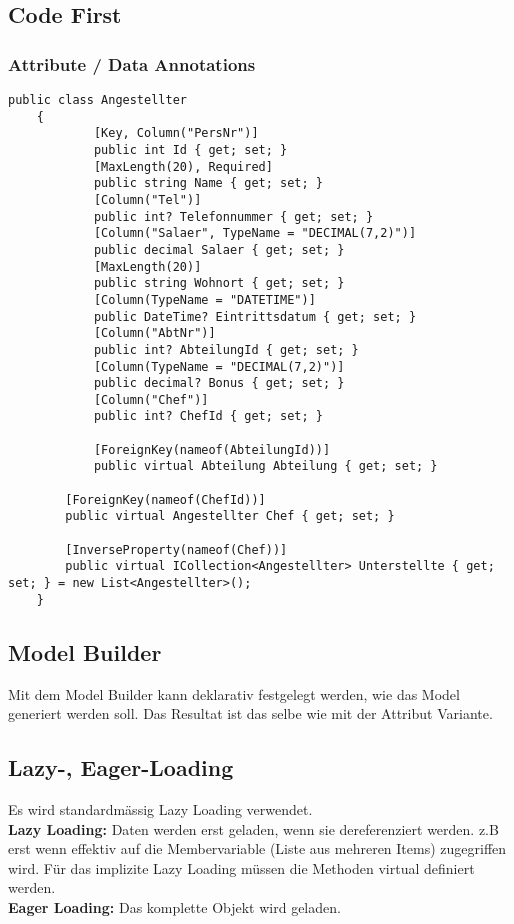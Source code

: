 \subsection{Code First}
\subsubsection{Attribute / Data Annotations}
\begin{lstlisting}
public class Angestellter
	{
            [Key, Column("PersNr")]
            public int Id { get; set; }
            [MaxLength(20), Required]
            public string Name { get; set; }
            [Column("Tel")]
            public int? Telefonnummer { get; set; }
            [Column("Salaer", TypeName = "DECIMAL(7,2)")]
            public decimal Salaer { get; set; }
            [MaxLength(20)]
            public string Wohnort { get; set; }
            [Column(TypeName = "DATETIME")]
            public DateTime? Eintrittsdatum { get; set; }
            [Column("AbtNr")]
            public int? AbteilungId { get; set; }
            [Column(TypeName = "DECIMAL(7,2)")]
            public decimal? Bonus { get; set; }
            [Column("Chef")]
            public int? ChefId { get; set; }

            [ForeignKey(nameof(AbteilungId))]
            public virtual Abteilung Abteilung { get; set; }

        [ForeignKey(nameof(ChefId))]
        public virtual Angestellter Chef { get; set; }

        [InverseProperty(nameof(Chef))]
        public virtual ICollection<Angestellter> Unterstellte { get; set; } = new List<Angestellter>();
	} 
\end{lstlisting}

\subsection{Model Builder}
Mit dem Model Builder kann deklarativ festgelegt werden, wie das Model generiert werden soll. Das Resultat ist das selbe wie mit der Attribut Variante.

\subsection{Lazy-, Eager-Loading}
Es wird standardmässig Lazy Loading verwendet. \\
\textbf{Lazy Loading:} Daten werden erst geladen, wenn sie dereferenziert werden. z.B erst wenn effektiv auf die Membervariable (Liste aus mehreren Items) zugegriffen wird. Für das implizite Lazy Loading müssen die Methoden virtual definiert werden. \\
\textbf{Eager Loading:} Das komplette Objekt wird geladen.

